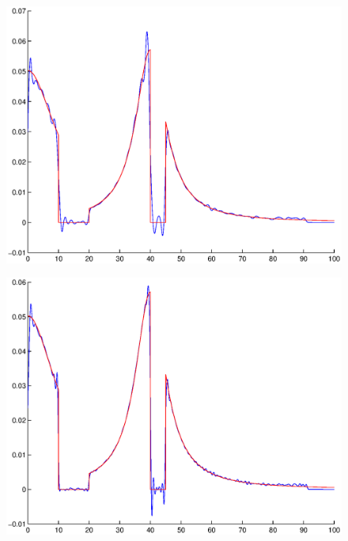 \documentclass[A4paper,11pt]{article}
\theoremstyle{definition}
\begin{document}
\begin{figure}[H]
\centering
\begin{minipage}{.33\textwidth}
  \centering
  \vspace{0.22cm}
  \includegraphics[scale=0.25]{pictures/Example9/Fig5.eps}
  \label{fig:9_5}
\end{minipage}%
\begin{minipage}{.33\textwidth}
  \centering
  \vspace{0.2cm}
  \includegraphics[scale=0.25]{pictures/Example9/Fig6.eps}
  \label{fig:9_6}
\end{minipage}%
\begin{minipage}{.33\textwidth}
  \centering

\end{minipage}
\end{figure}
\end{document}
